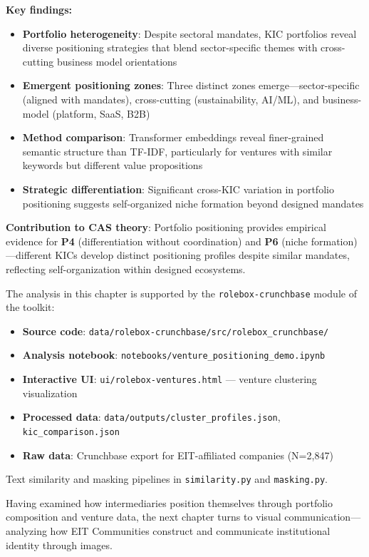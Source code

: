 \documentclass[../main.tex]{subfiles}
\begin{document}
\begin{summarybox}
\textbf{Key findings:}
\begin{itemize}[leftmargin=*, itemsep=0.1em]
\item \textbf{Portfolio heterogeneity}: Despite sectoral mandates, KIC portfolios reveal diverse positioning strategies that blend sector-specific themes with cross-cutting business model orientations
\item \textbf{Emergent positioning zones}: Three distinct zones emerge---sector-specific (aligned with mandates), cross-cutting (sustainability, AI/ML), and business-model (platform, SaaS, B2B)
\item \textbf{Method comparison}: Transformer embeddings reveal finer-grained semantic structure than TF-IDF, particularly for ventures with similar keywords but different value propositions
\item \textbf{Strategic differentiation}: Significant cross-KIC variation in portfolio positioning suggests self-organized niche formation beyond designed mandates
\end{itemize}

\textbf{Contribution to CAS theory}: Portfolio positioning provides empirical evidence for \textbf{P4} (differentiation without coordination) and \textbf{P6} (niche formation)---different KICs develop distinct positioning profiles despite similar mandates, reflecting self-organization within designed ecosystems.
\end{summarybox}

\vspace{0.5em}
\begin{replicationbox}
The analysis in this chapter is supported by the \texttt{rolebox-crunchbase} module of the \RoleBox{} toolkit:
\begin{itemize}[leftmargin=*, itemsep=0.2em]
\item \textbf{Source code}: \texttt{data/rolebox-crunchbase/src/rolebox\_crunchbase/}
\item \textbf{Analysis notebook}: \texttt{notebooks/venture\_positioning\_demo.ipynb}
\item \textbf{Interactive UI}: \texttt{ui/rolebox-ventures.html} --- venture clustering visualization
\item \textbf{Processed data}: \texttt{data/outputs/cluster\_profiles.json}, \texttt{kic\_comparison.json}
\item \textbf{Raw data}: Crunchbase export for EIT-affiliated companies (N=2,847)
\end{itemize}
Text similarity and masking pipelines in \texttt{similarity.py} and \texttt{masking.py}.
\end{replicationbox}

\vspace{1em}
Having examined how intermediaries position themselves through portfolio composition and venture data, the next chapter turns to visual communication---analyzing how EIT Communities construct and communicate institutional identity through images.
\end{document}
